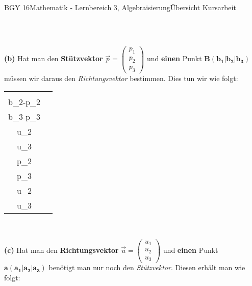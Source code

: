 \documentclass[oneside,openany,headings=optiontotoc,11pt,numbers=noenddot]{scrreprt}
\begin{document}
\begin{worksheet}{BGY 16}{Mathematik - Lernbereich 3, Algebraisierung}{Übersicht Kursarbeit}
\begin{framed}
\begin{tabularx}{\textwidth}{ccc}
			\end{tabularx}\\
			\par\bigskip\noindent
			\textbf{(b)} Hat man den \textbf{Stützvektor} \(\vec{p} = \left(\begin{array}{c}p_1\\p_2\\p_3\end{array}\right)\) und \textbf{einen} Punkt \(\mathbf{B (b_1|b_2|b_3)}\) müssen wir daraus den \textit{Richtungsvektor} bestimmen. Dies tun wir wie folgt:\\
			\par\noindent
			\begin{tabularx}{\textwidth}{cc}
				\(\vec{u} = \left(\begin{array}{c}b_1-p_1\\b_2-p_2\\b_3-p_3\end{array}\right) = \underbrace{\left(\begin{array}{c}u_1\\u_2\\u_3\end{array}\right)}_{Richtungsvektor}\) & \(\Rightarrow \mathbf{g:} \vec{x} \mathbf{= \left(\begin{array}{c}p_1\\p_2\\p_3\end{array}\right) + r*\left(\begin{array}{c}u_1\\u_2\\u_3\end{array}\right)}\)
			\end{tabularx}\\
			\par\bigskip\noindent
			\textbf{(c)} Hat man den \textbf{Richtungsvektor} \(\vec{u} = \left(\begin{array}{c}u_1\\u_2\\u_3\end{array}\right)\) und \textbf{einen} Punkt \(\mathbf{a (a_1|a_2|a_3)}\) benötigt man nur noch den \textit{Stützvektor}. Diesen erhält man wie folgt:\\
			\par\noindent
			\begin{tabularx}{\textwidth}{cc}

\end{tabularx}
\end{framed}
\end{worksheet}
\end{document}

